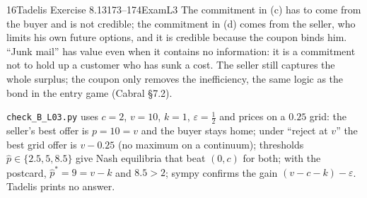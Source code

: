 \begin{exsol}{16}{Tadelis Exercise 8.13}{173--174}{Exam}{L3}
\interp The commitment in (c) has to come from the buyer and is not credible; the commitment in
(d) comes from the seller, who limits his own future options, and it is credible because the
coupon binds him. ``Junk mail'' has value even when it contains no information: it is a
commitment not to hold up a customer who has sunk a cost. The seller still captures the whole
surplus; the coupon only removes the inefficiency, the same logic as the bond in the entry game
(Cabral \S7.2).

\verify \texttt{check\_B\_L03.py} uses $c = 2$, $v = 10$, $k = 1$, $\varepsilon = \frac12$ and prices
on a $0.25$ grid: the seller's best offer is $p = 10 = v$ and the buyer stays home; under
``reject at $v$'' the best grid offer is $v - 0.25$ (no maximum on a continuum); thresholds
$\hat p \in \{2.5, 5, 8.5\}$ give Nash equilibria that beat $(0, c)$ for both; with the postcard,
$\hat p^* = 9 = v - k$ and $8.5 > 2$; sympy confirms the gain $(v - c - k) - \varepsilon$. Tadelis
prints no answer.

\end{exsol}
